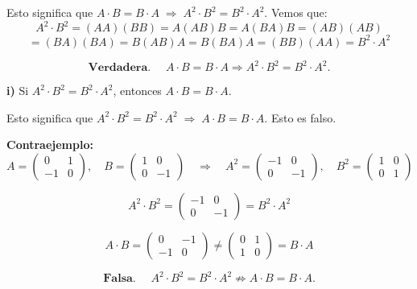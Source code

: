 \documentclass[a4paper,12pt]{article}
\begin{document}
\begin{ejercicio}[title=Ejercicio 42 (⋆)]
\vspace{0.5em}

Esto significa que $A \cdot B = B \cdot A \;\Rightarrow\; A^2 \cdot B^2 = B^2 \cdot A^2$.  
Vemos que:
\[
A^2 \cdot B^2 = (A A)(B B) = A(AB)B = A(BA)B = (AB)(AB)
\]
\[
= (BA)(BA) = B(AB)A = B(BA)A = (BB)(AA) = B^2 \cdot A^2
\]

\[
\boxed{\textbf{Verdadera. }\quad A \cdot B = B \cdot A \Rightarrow A^2 \cdot B^2 = B^2 \cdot A^2.}
\]

\vspace{1em}

\textbf{i)} Si $A^2 \cdot B^2 = B^2 \cdot A^2$, entonces $A \cdot B = B \cdot A$.

\vspace{0.5em}

Esto significa que $A^2 \cdot B^2 = B^2 \cdot A^2 \;\Rightarrow\; A \cdot B = B \cdot A$.  
Esto es falso.

\vspace{0.5em}

\textbf{Contraejemplo:}
\[
A = \begin{pmatrix}0 & 1 \\ -1 & 0\end{pmatrix}, \quad
B = \begin{pmatrix}1 & 0 \\ 0 & -1\end{pmatrix}
\quad \Rightarrow \quad
A^2 = \begin{pmatrix}-1 & 0 \\ 0 & -1\end{pmatrix}, \quad
B^2 = \begin{pmatrix}1 & 0 \\ 0 & 1\end{pmatrix}
\]

\[
A^2 \cdot B^2 = \begin{pmatrix}-1 & 0 \\ 0 & -1\end{pmatrix}
= B^2 \cdot A^2
\]

\[
A \cdot B = \begin{pmatrix}0 & -1 \\ -1 & 0\end{pmatrix}
\neq
\begin{pmatrix}0 & 1 \\ 1 & 0\end{pmatrix} = B \cdot A
\]

\[
\boxed{\textbf{Falsa. }\quad A^2 \cdot B^2 = B^2 \cdot A^2 \not\Rightarrow A \cdot B = B \cdot A.}
\]
\end{ejercicio}
\end{document}
